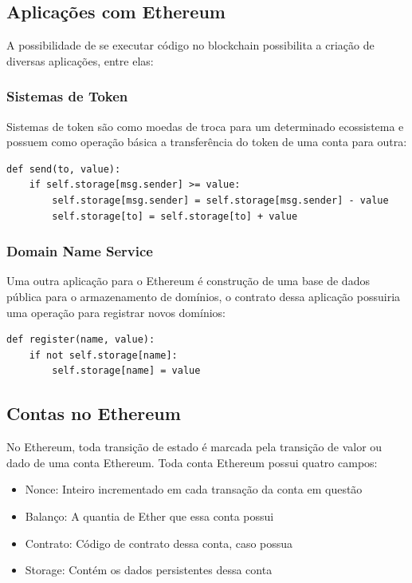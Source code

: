 \subsection{Aplicações com Ethereum}

A possibilidade de se executar código no blockchain possibilita a criação de diversas aplicações, entre elas:

\subsubsection{Sistemas de Token}

Sistemas de token são como moedas de troca para um determinado ecossistema e possuem como operação básica a transferência do token de uma conta para outra:

\begin{verbatim}
def send(to, value):
    if self.storage[msg.sender] >= value:
        self.storage[msg.sender] = self.storage[msg.sender] - value
        self.storage[to] = self.storage[to] + value
\end{verbatim}

\subsubsection{Domain Name Service}

Uma outra aplicação para o Ethereum é construção de uma base de dados pública para o armazenamento de domínios, o contrato dessa aplicação possuiria uma operação para registrar novos domínios:

\begin{verbatim}
def register(name, value):
    if not self.storage[name]:
        self.storage[name] = value
\end{verbatim}

\subsection{Contas no Ethereum}

No Ethereum, toda transição de estado é marcada pela transição de valor ou dado de uma conta Ethereum. Toda conta Ethereum possui quatro campos:

\begin{itemize}
\item Nonce: Inteiro incrementado em cada transação da conta em questão
\item Balanço: A quantia de Ether que essa conta possui
\item Contrato: Código de contrato dessa conta, caso possua
\item Storage: Contém os dados persistentes dessa conta
\end{itemize}

